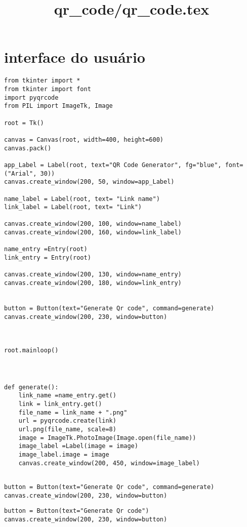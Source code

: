 \documentclass[letterpaper]{article}
\date{} %
\title{\textbf{qr_code/qr_code.tex}}
\begin{document}
\maketitle

\section{interface do usuário}

\begin{lstlisting}[style=pythonStyle, title=demo.py ] 
from tkinter import *
from tkinter import font
import pyqrcode
from PIL import ImageTk, Image

root = Tk()

canvas = Canvas(root, width=400, height=600)
canvas.pack()

app_Label = Label(root, text="QR Code Generator", fg="blue", font= ("Arial", 30))
canvas.create_window(200, 50, window=app_Label)

name_label = Label(root, text= "Link name")
link_label = Label(root, text= "Link")

canvas.create_window(200, 100, window=name_label)
canvas.create_window(200, 160, window=link_label)

name_entry =Entry(root)
link_entry = Entry(root)

canvas.create_window(200, 130, window=name_entry)
canvas.create_window(200, 180, window=link_entry)


button = Button(text="Generate Qr code", command=generate)
canvas.create_window(200, 230, window=button)



root.mainloop()
\end{lstlisting}

\section{}
\begin{lstlisting}[style=pythonStyle-on,  title= função para criação do do qr code em si] 
    
def generate():
    link_name =name_entry.get()
    link = link_entry.get()
    file_name = link_name + ".png"
    url = pyqrcode.create(link)
    url.png(file_name, scale=8)
    image = ImageTk.PhotoImage(Image.open(file_name))
    image_label =Label(image = image)
    image_label.image = image
    canvas.create_window(200, 450, window=image_label)


\end{lstlisting}

\begin{lstlisting}[style=pythonStyle-on, title = linha 173 ] 
button = Button(text="Generate Qr code", command=generate)
canvas.create_window(200, 230, window=button)
\end{lstlisting}

\begin{lstlisting}[style=pythonStyle-o, ff title = linha 173 ] 
button = Button(text="Generate Qr code")
canvas.create_window(200, 230, window=button)
\end{lstlisting}
\end{document}
